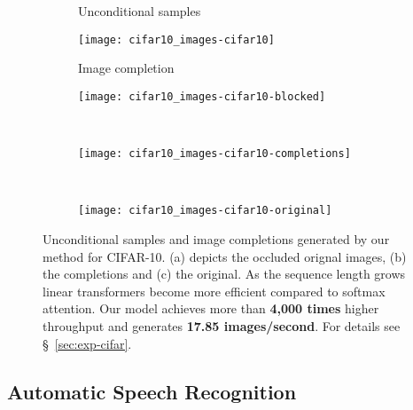 \documentclass{article}
\begin{document}
\begin{figure}[h]
    \centering
    \begin{subfigure}[t]{0.9\columnwidth}
        \centering
        Unconditional samples
    \end{subfigure}
    \begin{subfigure}[t]{0.9\columnwidth}
        \texttt{[image: cifar10\_images-cifar10]}
        \vspace{0.3em}
    \end{subfigure}
    \begin{subfigure}[t]{0.9\columnwidth}
        \centering
        Image completion
    \end{subfigure}
    \begin{subfigure}[t]{0.0971\columnwidth}
        \texttt{[image: cifar10\_images-cifar10-blocked]}
        \caption{}
    \end{subfigure}\,\,
    \begin{subfigure}[t]{0.6\columnwidth}
        \texttt{[image: cifar10\_images-cifar10-completions]}
        \caption{} \label{fig:cifar-completions}
    \end{subfigure}\,\,
    \begin{subfigure}[t]{0.0971\columnwidth}
        \texttt{[image: cifar10\_images-cifar10-original]}
        \caption{}
    \end{subfigure}
    \caption{Unconditional samples and image completions generated by our
             method for CIFAR-10. (a) depicts the occluded orignal images, (b) the
             completions and (c) the original. As the sequence length grows
             linear transformers become more efficient compared to softmax
             attention. Our model achieves more than \textbf{4,000 times}
             higher throughput and generates \textbf{17.85 images/second}.
             For details see \S~\ref{sec:exp-cifar}.}
    \label{fig:cifar-images}
\end{figure}

\subsection{Automatic Speech Recognition} \label{sec:asr}
\end{document}
